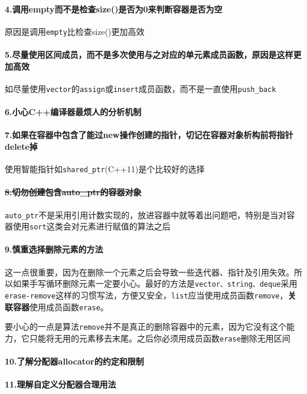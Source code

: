 \documentclass[UTF8,a4paper,12pt]{ctexbook}
\begin{document}
			\paragraph{4.调用empty而不是检查size()是否为0来判断容器是否为空} 原因是调用\verb|empty|比检查size()更加高效
			\paragraph{5.尽量使用区间成员，而不是多次使用与之对应的单元素成员函数，原因是这样更加高效} 如尽量使用\verb|vector|的\verb|assign|或\verb|insert|成员函数，而不是一直使用\verb|push_back|
			\paragraph{6.小心C++编译器最烦人的分析机制}
			\paragraph{7.如果在容器中包含了能过new操作创建的指针，切记在容器对象析构前将指针delete掉} 使用智能指针如\verb|shared_ptr|(C++11)是个比较好的选择
			\paragraph{\sout{8.切勿创建包含auto\_ptr的容器对象}} \verb|auto_ptr|不是采用引用计数实现的，放进容器中就等着出问题吧，特别是当对容器使用\verb|sort|这类会对元素进行赋值的算法之后
			
			\paragraph{9.慎重选择删除元素的方法} 这一点很重要，因为在删除一个元素之后会导致一些迭代器、指针及引用失效。所以如果手写循环删除元素一定要小心。最好的方法是\verb|vector、string、deque|采用\verb|erase-remove|这样的习惯写法，方便又安全，\verb|list|应当使用成员函数\verb|remove|，\textbf{关联容器}使用成员函数\verb|erase|。
				
			要小心的一点是算法\verb|remove|并不是真正的删除容器中的元素，因为它没有这个能力，它只能将无用的元素移去末尾。之后你必须用成员函数\verb|erase|删除无用区间
			\paragraph{10.了解分配器allocator的约定和限制}
			\paragraph{11.理解自定义分配器合理用法}
\end{document}
